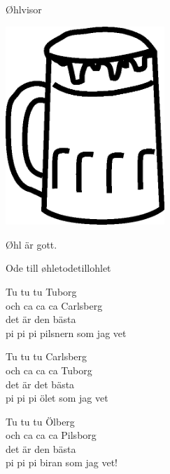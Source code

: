 \begin{flushleft}
{\Huge Øhlvisor\\}

\end{flushleft}

\vspace{2cm}
\begin{center}
\includegraphics[width=6cm]{bilder/69.eps}

{\Large
\vspace{1cm}
Øhl är gott.
}
\end{center}

\newpage

\begin{song}{Ode till øhlet}{odetillohlet}
\begin{vers}
Tu tu tu Tuborg\\
och ca ca ca Carlsberg\\
det är den bästa\\
pi pi pi pilsnern som jag vet\\
\end{vers}
\begin{vers}
Tu tu tu Carlsberg\\
och ca ca ca Tuborg\\
det är det bästa\\
pi pi pi ölet som jag vet\\
\end{vers}
\begin{vers}
Tu tu tu Ölberg\\
och ca ca ca Pilsborg\\
det är den bästa\\
pi pi pi biran som jag vet!\\
\end{vers}
\end{song}

